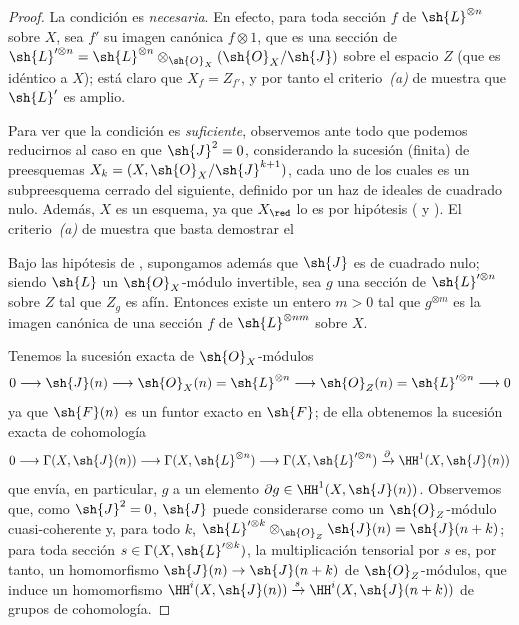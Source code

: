 \documentclass[oneside,10pt]{amsart}
\makeatletter
\newcommand{\ega@arrow}[2]{\mathchoice{#1}{#2}{#2}{#2}}
\renewcommand{\to}{\ega@arrow{\longrightarrow}{\rightarrow}}
\newcommand{\oldpage}[2][]{\marginnote{\normalfont\footnotesize\textbf{#1}~|~#2}\ignorespaces}
\let\EGAOriginalLabel\label
\renewcommand{\label}[1]{\phantomsection\EGAOriginalLabel{#1}}
\makeatother
\begin{document}
\begin{proof}
La condición es \emph{necesaria}.
En efecto, para toda sección $f$ de $\sh{L}^{\otimes n}$ sobre $X$, sea $f'$ su imagen canónica $f\otimes1$, que es una sección de $\sh{L}'^{\otimes n}=\sh{L}^{\otimes n}\otimes_{\sh{O}_X}(\sh{O}_X/\sh{J})$ sobre el espacio $Z$ (que es idéntico a $X$);
está claro que $X_f=Z_{f'}$, y por tanto el criterio~\emph{(a)} de  muestra que $\sh{L}'$ es amplio.

Para ver que la condición es \emph{suficiente}, observemos ante todo que podemos reducirnos al caso en que $\sh{J}^2=0$, considerando la sucesión (finita) de preesquemas $X_k=(X,\sh{O}_X/\sh{J}^{k+1})$, cada uno de los cuales es un subpreesquema cerrado del siguiente, definido por un haz de ideales de cuadrado nulo.
Además, $X$ es un esquema, ya que $X_\red$ lo es por hipótesis ( y ).
El criterio~\emph{(a)} de  muestra que basta demostrar el
  \begin{lemma}[4.5.13.1]
  \label{II.4.5.13.1}
  Bajo las hipótesis de , supongamos además que $\sh{J}$ es de cuadrado nulo;
  siendo $\sh{L}$ un $\sh{O}_X$-módulo invertible, sea $g$ una sección de $\sh{L}'^{\otimes n}$ sobre $Z$ tal que $Z_g$ es afín.
  Entonces existe un entero $m>0$ tal que $g^{\otimes m}$ es la imagen canónica de una sección $f$ de $\sh{L}^{\otimes nm}$ sobre $X$.
  \end{lemma}

  Tenemos la sucesión exacta de $\sh{O}_X$-módulos
  \[
    0\to\sh{J}(n)\to\sh{O}_X(n)=\sh{L}^{\otimes n}\to\sh{O}_Z(n)=\sh{L}'^{\otimes n}\to0
  \]
\oldpage[II]{88}
  ya que $\sh{F}(n)$ es un funtor exacto en $\sh{F}$;
  de ella obtenemos la sucesión exacta de cohomología
  \[
    0\to\Gamma(X,\sh{J}(n))\to\Gamma(X,\sh{L}^{\otimes n})\to\Gamma(X,\sh{L}'^{\otimes n})\xrightarrow{\partial}\HH^1(X,\sh{J}(n))
  \]
  que envía, en particular, $g$ a un elemento $\partial g\in\HH^1(X,\sh{J}(n))$.
  Observemos que, como $\sh{J}^2=0$, $\sh{J}$ puede considerarse como un $\sh{O}_Z$-módulo cuasi-coherente y, para todo $k$, $\sh{L}'^{\otimes k}\otimes_{\sh{O}_Z}\sh{J}(n)=\sh{J}(n+k)$;
  para toda sección $s\in\Gamma(X,\sh{L}'^{\otimes k})$, la multiplicación tensorial por $s$ es, por tanto, un homomorfismo $\sh{J}(n)\to\sh{J}(n+k)$ de $\sh{O}_Z$-módulos, que induce un homomorfismo $\HH^i(X,\sh{J}(n))\xrightarrow{s}\HH^i(X,\sh{J}(n+k))$ de grupos de cohomología.


\end{proof}
\end{document}
